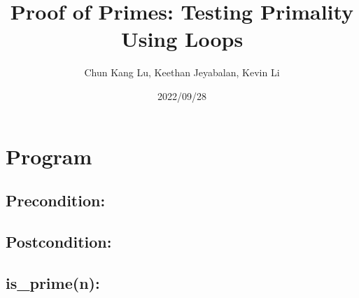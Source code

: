 \documentclass{article}
\title{Proof of Primes: Testing Primality Using Loops}
\author{Chun Kang Lu, Keethan Jeyabalan, Kevin Li}
\date{2022/09/28}
\begin{document}
	\maketitle
	\flushleft
	\section*{Program}
	\subsection* {Precondition:}
	\subsection* {Postcondition:}
	\subsection* {is_prime(n):}
	
\end{document}
